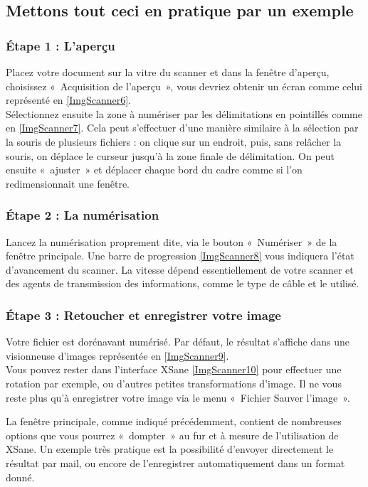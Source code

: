 \subsection{Mettons tout ceci en pratique par un exemple}
\subsubsection{Étape 1 : L'aperçu}
Placez votre document sur la vitre du scanner et dans la fenêtre d'aperçu, choisissez «~Acquisition de l'aperçu~», vous devriez obtenir un écran comme celui représenté en \ref{ImgScanner6}.\\
Sélectionnez ensuite la zone à numériser par les délimitations en pointillés comme en \ref{ImgScanner7}. Cela peut s'effectuer d'une manière similaire à la sélection par la souris de plusieurs fichiers : on clique sur un endroit, puis, sans relâcher la souris, on déplace le curseur jusqu'à la zone finale de délimitation. On peut ensuite «~ajuster~» et déplacer chaque bord du cadre comme si l'on redimensionnait une fenêtre.\par
\ScannerEtapeUn
\subsubsection{Étape 2 : La numérisation}
Lancez la numérisation proprement dite, via le bouton «~Numériser~» de la fenêtre principale. Une barre de progression \ref{ImgScanner8} vous indiquera l'état d'avancement du scanner. La vitesse dépend essentiellement de votre scanner et des agents de transmission des informations, comme le type de câble et le  utilisé.\par
{}
\subsubsection{Étape 3 : Retoucher et enregistrer votre image}
Votre fichier est dorénavant numérisé. Par défaut, le résultat s'affiche dans une visionneuse d'images représentée en \ref{ImgScanner9}.\\
Vous pouvez rester dans l'interface XSane \ref{ImgScanner10} pour effectuer une rotation par exemple, ou d'autres petites transformations d'image. Il ne vous reste plus qu'à enregistrer votre image via le menu «~Fichier \FlecheDroite Sauver l'image~».\par
\ScannerEtapeDeux
\begin{nota}
La fenêtre principale, comme indiqué précédemment, contient de nombreuses options que vous pourrez «~dompter~» au fur et à mesure de l'utilisation de XSane. Un exemple très pratique est la possibilité d'envoyer directement le résultat par mail, ou encore de l'enregistrer automatiquement dans un format donné.
\end{nota}
